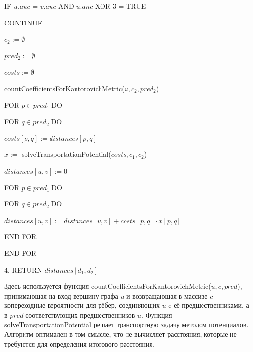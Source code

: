 \documentclass[12pt]{report}
\begin{document}
\hspace{3cm} IF $u.anc$ = $v.anc$ AND $u.anc$ XOR 3 = TRUE 

\hspace{4cm} CONTINUE

\hspace{3cm} $c_2 := \emptyset$

\hspace{3cm} $pred_2 := \emptyset$

\hspace{3cm} $costs := \emptyset$

\hspace{3cm} countCoefficientsForKantorovichMetric($u, c_2, pred_2$)

\hspace{3cm} FOR $p \in pred_1$ DO

\hspace{4cm} FOR $q \in pred_2$ DO

\hspace{5cm} $costs[p, q] := distances[p, q]$ 

\hspace{3cm} $x := $ solveTransportationPotential($costs, c_1, c_2$)

\hspace{3cm} $distances[u, v] := 0$

\hspace{3cm} FOR $p \in pred_1$ DO

\hspace{4cm} FOR $q \in pred_2$ DO

\hspace{5cm} $distances[u, v] := distances[u, v] + costs[p, q] \cdot x[p, q]$ 

\hspace{1cm} END FOR

\hspace{0.35cm} END FOR

4. RETURN $distances[d_1, d_2]$

\vspace{1cm}

Здесь используется функция countCoefficientsForKantorovichMetric($u, c, pred$), принимающая на вход вершину графа $u$ и возвращающая в массиве $c$ копереходные вероятности для рёбер, соединяющих $u$ c её предшественниками, а в $pred$ соответствующих предшественников $u$. Функция solveTransportationPotential решает транспортную задачу методом потенциалов. Алгоритм оптимален в том смысле, что не вычисляет расстояния, которые не требуются для определения итогового расстояния.
\end{document}
